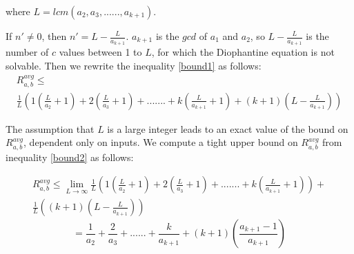 \documentclass[pdflatex,sn-mathphys-num]{sn-jnl}%
\theoremstyle{thmstyleone}%
\theoremstyle{thmstyletwo}%
\theoremstyle{thmstylethree}%
\begin{document}
where $L=lcm(a_2,a_3,......,a_{k+1})$. 
\par If $n' \ne 0$, then $n'=L-\frac{L}{a_{k+1}}$. $a_{k+1}$ is the $gcd$ of $a_1$ and $a_2$, so $L-\frac{L}{a_{k+1}}$ is the number of $c$ values between 1 to $L$, for which the Diophantine equation is not solvable.
Then we rewrite the inequality \ref{bound1} as follows:
\begin{multline}\label{bound2}
      R_{a,b}^{avg}\le \\\frac{1}{L}\left(1\left(\frac{L}{a_2}+1\right)+2\left(\frac{L}{a_3}+1\right)+.......+k\left(\frac{L}{a_{k+1}}+1\right)+(k+1)(L-\frac{L}{a_{k+1}})\right) 
 \end{multline}

The assumption that $L$ is a large integer leads to an exact value of the bound on $R_{a,b}^{avg}$, dependent only on inputs. We compute a tight upper bound on $R_{a,b}^{avg}$ from inequality \ref{bound2} as follows:

\begin{multline}R_{a,b}^{avg} \le \lim_{L \to \infty} \frac{1}{L}\left(1\left(\frac{L}{a_2}+1\right)+2\left(\frac{L}{a_3}+1\right)+.......+k\left(\frac{L}{a_{k+1}}+1\right)\right)+\\\frac{1}{L}\left((k+1)(L-\frac{L}{a_{k+1}}) \right)\end{multline}
$$=\frac{1}{a_2}+\frac{2}{a_3}+......+\frac{k}{a_{k+1}}+(k+1)\left(\frac{a_{k+1}-1}{a_{k+1}}\right)$$
\end{document}
